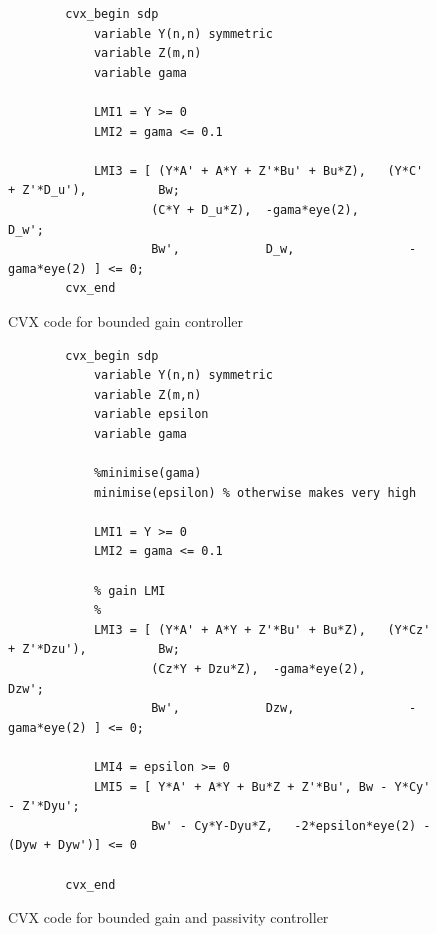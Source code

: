 \documentclass{article}
\begin{document}
\begin{figure}[H]
    \centering
    \begin{lstlisting}
        cvx_begin sdp
            variable Y(n,n) symmetric
            variable Z(m,n)
            variable gama

            LMI1 = Y >= 0
            LMI2 = gama <= 0.1
            
            LMI3 = [ (Y*A' + A*Y + Z'*Bu' + Bu*Z),   (Y*C' + Z'*D_u'),          Bw;
                    (C*Y + D_u*Z),  -gama*eye(2),      D_w';
                    Bw',            D_w,                -gama*eye(2) ] <= 0;
        cvx_end
    \end{lstlisting}
    \caption{CVX code for bounded gain controller}
    \label{fig:bounded_lmi}
\end{figure}

\begin{figure}[H]
    \centering
    \begin{lstlisting}
        cvx_begin sdp
            variable Y(n,n) symmetric
            variable Z(m,n)
            variable epsilon
            variable gama
            
            %minimise(gama)
            minimise(epsilon) % otherwise makes very high

            LMI1 = Y >= 0
            LMI2 = gama <= 0.1
            
            % gain LMI
            %
            LMI3 = [ (Y*A' + A*Y + Z'*Bu' + Bu*Z),   (Y*Cz' + Z'*Dzu'),          Bw;
                    (Cz*Y + Dzu*Z),  -gama*eye(2),      Dzw';
                    Bw',            Dzw,                -gama*eye(2) ] <= 0;
            
            LMI4 = epsilon >= 0
            LMI5 = [ Y*A' + A*Y + Bu*Z + Z'*Bu', Bw - Y*Cy' - Z'*Dyu';
                    Bw' - Cy*Y-Dyu*Z,   -2*epsilon*eye(2) - (Dyw + Dyw')] <= 0
                
        cvx_end
    \end{lstlisting}
    \caption{CVX code for bounded gain and passivity controller}
    \label{fig:bounded_passive_lmi}
\end{figure}
\end{document}

